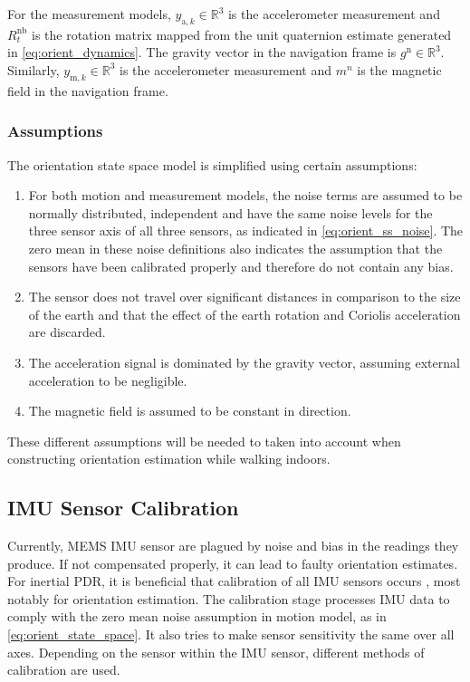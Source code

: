 For the measurement models, $y_{\mathrm{a}, k}\in \mathbb{R}^3$ is the accelerometer measurement and $R^\mathrm{nb}_t$ is the rotation matrix mapped from the unit quaternion estimate generated in \eqref{eq:orient_dynamics}. The gravity vector in the navigation frame is $g^\mathrm{n} \in \mathbb{R}^3$. Similarly, $y_{\mathrm{m}, k}\in \mathbb{R}^3$ is the accelerometer measurement and $m^n$ is the magnetic field in the navigation frame. \par 

\subsubsection{Assumptions}
The orientation state space model is simplified using certain assumptions:
\begin{enumerate}
	\item For both motion and measurement models, the noise terms are assumed to be normally distributed, independent and have the same noise levels for the three sensor axis of all three sensors, as indicated in \eqref{eq:orient_ss_noise}. The zero mean in these noise definitions also indicates the assumption that the sensors have been calibrated properly and therefore do not contain any bias. \par
	
	\item The sensor does not travel over significant distances in comparison to the size of the earth \cite{Kok2017} and that the effect of the earth rotation and Coriolis acceleration are discarded.
	 
	\item The acceleration signal is dominated by the gravity vector, assuming external acceleration to be negligible. 
	
	\item The magnetic field is assumed to be constant in direction. 
\end{enumerate}

These different assumptions will be needed to taken into account when constructing orientation estimation while walking indoors.

\subsection{\ac{IMU} Sensor Calibration}
\label{sec:sensor_calibration}
Currently, \ac{MEMS} \ac{IMU} sensor are plagued by noise and bias in the readings they produce. If not compensated properly, it can lead to faulty orientation estimates. For inertial \ac{PDR}, it is beneficial that  calibration of all IMU sensors occurs \cite{Moder2017}, most notably for orientation estimation. The calibration stage processes IMU data to comply with the zero mean noise assumption in motion model, as in \eqref{eq:orient_state_space}. It also tries to make sensor sensitivity the same over all axes. Depending on the sensor within the \ac{IMU} sensor, different methods of calibration are used. \par 

